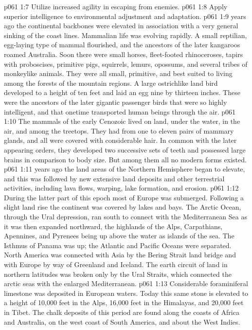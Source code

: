 \vs p061 1:7 \bibnobreakspace Utilize increased agility in escaping from enemies.
\vs p061 1:8 \bibnobreakspace Apply superior intelligence to environmental adjustment and adaptation.
\vs p061 1:9 \pc {} years ago the continental backbones were elevated in association with a very general sinking of the coast lines. Mammalian life was evolving rapidly. A small reptilian, egg\hyp{}laying type of mammal flourished, and the ancestors of the later kangaroos roamed Australia. Soon there were small horses, fleet\hyp{}footed rhinoceroses, tapirs with proboscises, primitive pigs, squirrels, lemurs, opossums, and several tribes of monkeylike animals. They were all small, primitive, and best suited to living among the forests of the mountain regions. A large ostrichlike land bird developed to a height of ten feet and laid an egg nine by thirteen inches. These were the ancestors of the later gigantic passenger birds that were so highly intelligent, and that onetime transported human beings through the air.
\vs p061 1:10 The mammals of the early Cenozoic lived on land, under the water, in the air, and among the treetops. They had from one to eleven pairs of mammary glands, and all were covered with considerable hair. In common with the later appearing orders, they developed two successive sets of teeth and possessed large brains in comparison to body size. But among them all no modern forms existed.
\vs p061 1:11 \pc {} years ago the land areas of the Northern Hemisphere began to elevate, and this was followed by new extensive land deposits and other terrestrial activities, including lava flows, warping, lake formation, and erosion.
\vs p061 1:12 During the latter part of this epoch most of Europe was submerged. Following a slight land rise the continent was covered by lakes and bays. The Arctic Ocean, through the Ural depression, ran south to connect with the Mediterranean Sea as it was then expanded northward, the highlands of the Alps, Carpathians, Apennines, and Pyrenees being up above the water as islands of the sea. The Isthmus of Panama was up; the Atlantic and Pacific Oceans were separated. North America was connected with Asia by the Bering Strait land bridge and with Europe by way of Greenland and Iceland. The earth circuit of land in northern latitudes was broken only by the Ural Straits, which connected the arctic seas with the enlarged Mediterranean.
\vs p061 1:13 Considerable foraminiferal limestone was deposited in European waters. Today this same stone is elevated to a height of 10,000 feet in the Alps, 16,000 feet in the Himalayas, and 20,000 feet in Tibet. The chalk deposits of this period are found along the coasts of Africa and Australia, on the west coast of South America, and about the West Indies.
